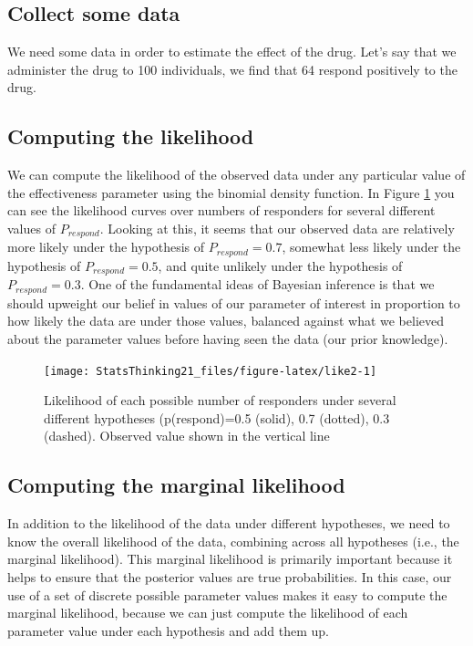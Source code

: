 \documentclass[
  12pt,
]{book}
\begin{document}
\hypertarget{collect-some-data-1}{%
\subsection{Collect some data}\label{collect-some-data-1}}

We need some data in order to estimate the effect of the drug. Let's say that we administer the drug to 100 individuals, we find that 64 respond positively to the drug.

\hypertarget{computing-the-likelihood-1}{%
\subsection{Computing the likelihood}\label{computing-the-likelihood-1}}

We can compute the likelihood of the observed data under any particular value of the effectiveness parameter using the binomial density function. In Figure \ref{fig:like2} you can see the likelihood curves over numbers of responders for several different values of \(P_{respond}\). Looking at this, it seems that our observed data are relatively more likely under the hypothesis of \(P_{respond}=0.7\), somewhat less likely under the hypothesis of \(P_{respond}=0.5\), and quite unlikely under the hypothesis of \(P_{respond}=0.3\). One of the fundamental ideas of Bayesian inference is that we should upweight our belief in values of our parameter of interest in proportion to how likely the data are under those values, balanced against what we believed about the parameter values before having seen the data (our prior knowledge).

\begin{figure}
\texttt{[image: StatsThinking21\_files/figure-latex/like2-1]} \caption{Likelihood of each possible number of responders under several different hypotheses (p(respond)=0.5 (solid), 0.7 (dotted), 0.3 (dashed).  Observed value shown in the vertical line}\label{fig:like2}
\end{figure}

\hypertarget{computing-the-marginal-likelihood-1}{%
\subsection{Computing the marginal likelihood}\label{computing-the-marginal-likelihood-1}}

In addition to the likelihood of the data under different hypotheses, we need to know the overall likelihood of the data, combining across all hypotheses (i.e., the marginal likelihood). This marginal likelihood is primarily important because it helps to ensure that the posterior values are true probabilities. In this case, our use of a set of discrete possible parameter values makes it easy to compute the marginal likelihood, because we can just compute the likelihood of each parameter value under each hypothesis and add them up.
\end{document}
